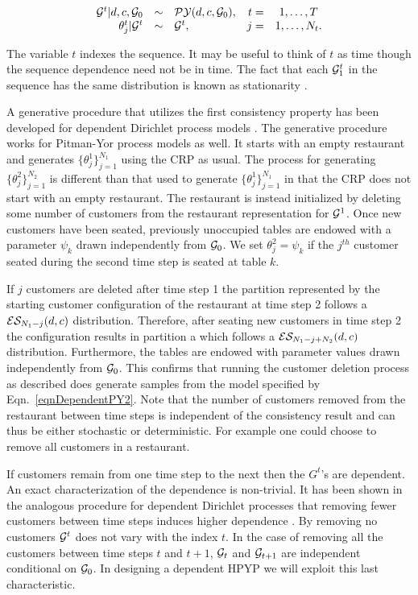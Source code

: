 \begin{equation}
\begin{array}{rclrcr}
\G^t | d, c, \G_0 &\sim& \PY(d,c,\G_0),  & t =&1, \dots, T\\
 \label{eqnDependentPY2}  \theta_j^t | \G^t &\sim& \G^t, & j =&1, \dots ,N_t.
 \end{array}
 \end{equation}
 
The variable $t$ indexes the sequence.  It may be useful to think of $t$ as time though the sequence dependence need not be in time. The fact that each $\G^t_1$ in the sequence has the same distribution is known as stationarity \cite{Brockwell1991}.  
 
A generative procedure that utilizes the first consistency property has been developed for dependent Dirichlet process models \cite{Caron2007}.  The generative procedure works for Pitman-Yor process models as well. It starts with an empty restaurant and generates $\{ \theta_j^1\}_{j= 1}^{N_1}$ using the CRP as usual.  The process for generating $\{ \theta_j^2\}_{j= 1}^{N_2}$ is different than that used to generate $\{ \theta_j^1\}_{j= 1}^{N_1}$ in that the CRP does not start with an empty restaurant.  The restaurant is instead initialized by deleting some number of customers from the restaurant representation for $\G^1$.  Once new customers have been seated, previously unoccupied tables are endowed with a parameter $\psi_k$ drawn independently from $\G_0$.  We set $\theta^2_j = \psi_k$ if  the $j^{th}$ customer seated during the second time step is seated at table $k$. 

If $j$ customers are deleted after time step 1 the partition represented by the starting customer configuration of the restaurant at time step 2 follows a $\ES_{N_1- j}(d,c)$ distribution.  Therefore, after seating new customers in time step 2 the configuration results in partition a which follows a $\ES_{N_1 - j + N_2}(d,c)$ distribution. Furthermore, the tables are endowed with parameter values drawn independently from $\G_0$.  This confirms that running the customer deletion process as described does generate samples from the model specified by Eqn.~\ref{eqnDependentPY2}. Note that the number of customers removed from the restaurant between time steps is independent of the consistency result and can thus be either stochastic or deterministic. For example one could choose to remove all customers in a restaurant.

If customers remain from one time step to the next then the $G^t$'s are dependent.  An exact characterization of the dependence is non-trivial.   It has been shown in the analogous procedure for dependent Dirichlet processes that removing fewer customers between time steps induces higher dependence \cite{Caron2007}.  By removing no customers $\G^t$ does not vary with the index $t$.  In the case of removing all the customers between time steps $t$ and $t+1$,  $\G_t$ and $\G_{t+1}$ are independent conditional on $\G_0$.  In designing a dependent HPYP we will exploit this last characteristic.

